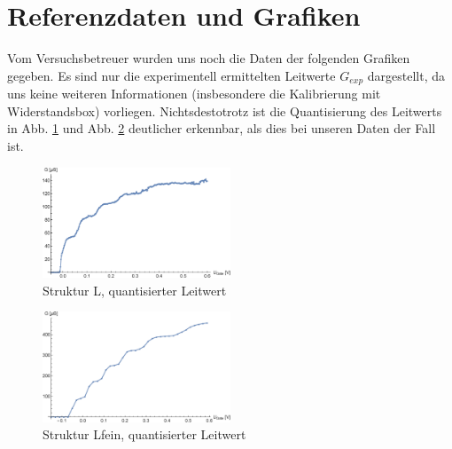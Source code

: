 \documentclass[aps,twocolumn,secnumarabic,nobalancelastpage,amsmath,amssymb,
nofootinbib,superscriptaddress]{revtex4-1}
\begin{document}
\newpage
\appendix

\section{Referenzdaten und Grafiken}
Vom Versuchsbetreuer wurden uns noch die Daten der folgenden Grafiken gegeben.
Es sind nur die experimentell ermittelten Leitwerte $G_{exp}$ dargestellt, da uns
keine weiteren Informationen (insbesondere die Kalibrierung mit Widerstandsbox)
vorliegen. Nichtsdestotrotz ist die Quantisierung des Leitwerts in Abb. \ref{fig:l}
und Abb. \ref{fig:lfein} deutlicher erkennbar, als dies bei unseren Daten der Fall ist.

\begin{figure}[h]
  \centering
  \includegraphics[width=0.5\textwidth]{Berechnung-Bilder/l.eps}
  \caption{Struktur L, quantisierter Leitwert}
  \label{fig:l}
\end{figure}

\begin{figure}[h]
  \centering
  \includegraphics[width=0.5\textwidth]{Berechnung-Bilder/lfein.eps}
  \caption{Struktur Lfein, quantisierter Leitwert}
  \label{fig:lfein}
\end{figure}


\end{document}
